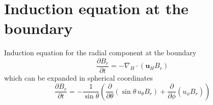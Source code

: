 \section{Induction equation at the boundary}

Induction equation for the radial component at the boundary
\begin{equation}
    \frac{\partial B_r}{\partial t} = -\nabla_H \cdot (\mathbf{u}_H B_r)
\end{equation}
which can be expanded in spherical coordinates
\[
    \frac{\partial B_r}{\partial t} = - \frac{1}{\sin\theta} \left(\frac{\partial}{\partial\theta} \left(\sin\theta \, u_\theta B_r\right) + \frac{\partial}{\partial \phi} \left(u_\phi B_r\right)\right)
\]

